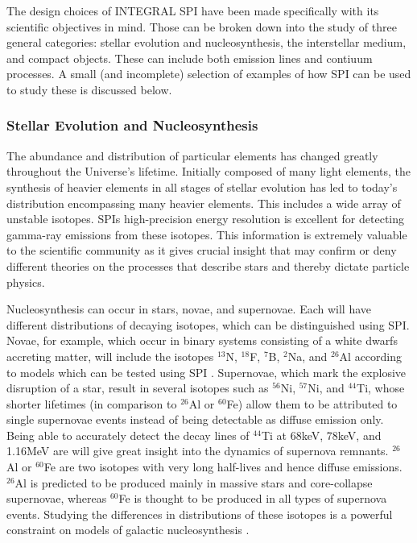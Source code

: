\documentclass{report}
\begin{document}
The design choices of INTEGRAL SPI have been made specifically with its scientific objectives in mind. Those can be broken down into the study of three general categories: stellar evolution and nucleosynthesis, the interstellar medium, and compact objects. These can include both emission lines and contiuum processes. A small (and incomplete) selection of examples of how SPI can be used to study these is discussed below.

\subsubsection*{Stellar Evolution and Nucleosynthesis}
The abundance and distribution of particular elements has changed greatly throughout the Universe's lifetime. Initially composed of many light elements, the synthesis of heavier elements in all stages of stellar evolution has led to today's distribution encompassing many heavier elements. This includes a wide array of unstable isotopes. SPIs high-precision energy resolution is excellent for detecting gamma-ray emissions from these isotopes. This information is extremely valuable to the scientific community as it gives crucial insight that may confirm or deny different theories on the processes that describe stars and thereby dictate particle physics.

Nucleosynthesis can occur in stars, novae, and supernovae. Each will have different distributions of decaying isotopes, which can be distinguished using SPI. Novae, for example, which occur in binary systems consisting of a white dwarfs accreting matter, will include the isotopes $^{13}$N, $^{18}$F, $^{7}$B, $^{2}$Na, and $^{26}$Al according to models which can be tested using SPI \cite{Wunderer2002ImagingWT}. Supernovae, which mark the explosive disruption of a star, result in several isotopes such as $^{56}$Ni, $^{57}$Ni, and $^{44}$Ti, whose shorter lifetimes (in comparison to $^{26}$Al or $^{60}$Fe) allow them to be attributed to single supernovae events instead of being detectable as diffuse emission only. Being able to accurately detect the decay lines of $^{44}$Ti at 68keV, 78keV, and 1.16MeV are will give great insight into the dynamics of supernova remnants. $^{26}$Al or $^{60}$Fe are two isotopes with very long half-lives and hence diffuse emissions. $^{26}$Al is predicted to be produced mainly in massive stars and core-collapse supernovae, whereas $^{60}$Fe is thought to be produced in all types of supernova events. Studying the differences in distributions of these isotopes is a powerful constraint on models of galactic nucleosynthesis \cite{Wunderer2002ImagingWT}.
\end{document}

